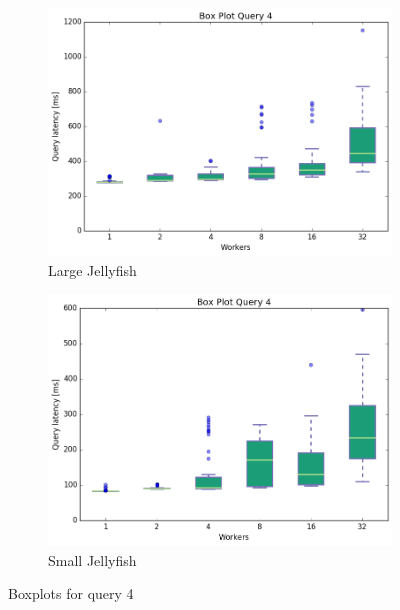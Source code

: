 \documentclass[11pt,singlecolumn]{scrartcl}
\begin{document}
\begin{figure}
        \begin{subfigure}[b]{0.475\textwidth}   
            \centering 
            \includegraphics[width=\textwidth]{boxesjl/q4}
            \caption[]%
            {{\small Large Jellyfish}}    
            \label{fig:mean and std of net34}
        \end{subfigure}
        \quad
        \begin{subfigure}[b]{0.475\textwidth}   
            \centering 
            \includegraphics[width=\textwidth]{boxesjs/q4}
            \caption[]%
            {{\small Small Jellyfish}}    
            \label{fig:mean and std of net44}
        \end{subfigure}
        \caption[  Boxplots for query 4 ]
        {\small Boxplots for query 4} 
        \label{fig:mean and std of nets}
    \end{figure}
\clearpage
\end{document}
